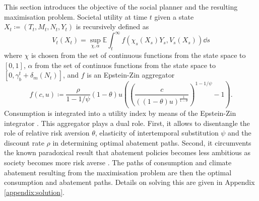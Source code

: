 \documentclass[../../main.tex]{subfiles}
\begin{document}
This section introduces the objective of the social planner and the resulting maximisation problem. Societal utility at time $t$ given a state $X_t \coloneqq (T_t, M_t, N_t, Y_t)$ is recursively defined as \begin{equation} \label{eq:social-objective}
    V_t(X_t) = \sup_{\chi, \alpha} \mathbb{E} 
    \int_{t}^{\infty} f(\chi_s(X_s) Y_s, V_s(X_s)) \dd{s}
\end{equation} where $\chi$ is chosen from the set of continuous functions from the state space to $[0, 1]$, $\alpha$ from the set of continuos functions from the state space to $[0, \gamma^t_b + \delta_m(N_t)]$, and $f$ is an Epstein-Zin aggregator \begin{equation} \label{eq:aggregator}
    f(c, u) \coloneqq \frac{\rho}{1 - 1 / \psi} (1 - \theta) u  \left( \left(\frac{c}{((1 - \theta) u)^{\frac{1}{1 - \theta}}}\right)^{1 - 1 / \psi} - 1 \right).
\end{equation} Consumption is integrated into a utility index by means of the Epstein-Zin integrator \citep{duffie_asset_1992}. This aggregator plays a dual role. First, it allows to disentangle the role of relative risk aversion $\theta$, elasticity of intertemporal substitution $\psi$ and the discount rate $\rho$ in determining optimal abatement paths. Second, it circumvents the known paradoxical result that abatement policies becomes less ambitious as society becomes more risk averse \citep{pindyck_economic_2013}. The paths of consumption and climate abatement resulting from the maximisation problem are then the optimal consumption and abatement paths. Details on solving this are given in Appendix \ref{appendix:solution}.

\end{document}
